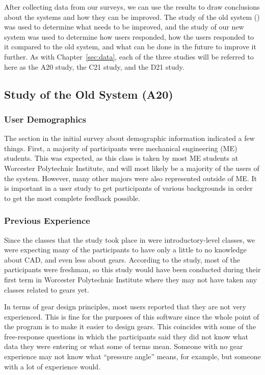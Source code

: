 \begin{doublespace}

After collecting data from our surveys, we can use the results to draw conclusions about the systems and how they can be improved. The study of the old system (\cite{holman_automated_2018}) was used to determine what needs to be improved, and the study of our new system was used to determine how users responded, how the users responded to it compared to the old system, and what can be done in the future to improve it further. As with Chapter~\ref{sec:data}, each of the three studies will be referred to here as the A20 study, the C21 study, and the D21 study.

\subsection{Study of the Old System (A20)}

\subsubsection{User Demographics}

The section in the initial survey about demographic information indicated a few things. First, a majority of participants were mechanical engineering (ME) students. This was expected, as this class is taken by most ME students at Worcester Polytechnic Institute, and will most likely be a majority of the users of the system. However, many other majors were also represented outside of ME. It is important in a user study to get participants of various backgrounds in order to get the most complete feedback possible.

\subsubsection{Previous Experience}

Since the classes that the study took place in were introductory-level classes, we were expecting many of the participants to have only a little to no knowledge about CAD, and even less about gears. According to the study, most of the participants were freshman, so this study would have been conducted during their first term in Worcester Polytechnic Institute where they may not have taken any classes related to gears yet. 

In terms of gear design principles, most users reported that they are not very experienced. This is fine for the purposes of this software since the whole point of the program is to make it easier to design gears. This coincides with some of the free-response questions in which the participants said they did not know what data they were entering or what some of terms mean. Someone with no gear experience may not know what ``pressure angle'' means, for example, but someone with a lot of experience would.


\end{doublespace}
